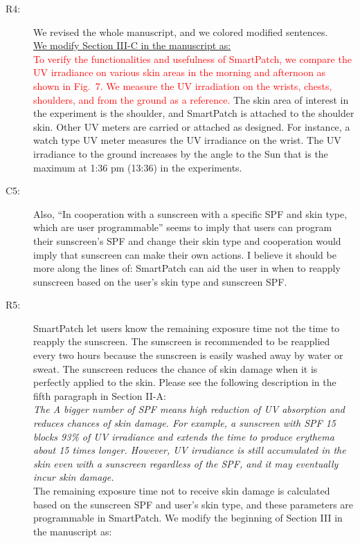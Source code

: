 \documentclass[onecolumn]{IEEEconf}
\begin{document}
\begin{description}
\item [R4: ] We revised the whole manuscript, and we colored modified sentences. \\

\underline{We modify Section III-C in the manuscript as:}\\
\textcolor{red}{To verify the functionalities and usefulness of SmartPatch, we compare the UV irradiance on various skin areas in the morning and afternoon as shown in Fig.~7. We measure the UV irradiation on the wrists, chests, shoulders, and from the ground as a reference.}
The skin area of interest in the experiment is the shoulder, and SmartPatch is attached to the shoulder skin. Other UV meters are carried or attached as designed. For instance, a watch type UV meter measures the UV irradiance on the wrist. The UV irradiance to the ground increases by the angle to the Sun that is the maximum at 1:36 pm (13:36) in the experiments.
~\\

\item [C5:] Also, ``In cooperation with a sunscreen with a specific SPF and skin type, which are user programmable'' seems to imply that users can program their sunscreen's SPF and change their skin type and cooperation would imply that sunscreen can make their own actions. I believe it should be more along the lines of: SmartPatch can aid the user in when to reapply sunscreen based on the user's skin type and sunscreen SPF.

\item [R5: ] 

SmartPatch let users know the remaining exposure time not the time to reapply the sunscreen. The sunscreen is recommended to be reapplied every two hours because the sunscreen is easily washed away by water or sweat. The sunscreen reduces the chance of skin damage when it is perfectly applied to the skin. Please see the following description in the fifth paragraph in Section II-A:\\

\textit{The A bigger number of SPF means high reduction of UV absorption and reduces chances of skin damage. For example, a sunscreen with SPF 15 blocks 93\% of UV irradiance and extends the time to produce erythema about 15 times longer. However, UV irradiance is still accumulated in the skin even with a sunscreen regardless of the SPF, and it may eventually incur skin damage.}\\

The remaining exposure time not to receive skin damage is calculated based on the sunscreen SPF and user's skin type, and these parameters are programmable in SmartPatch. We modify the beginning of Section III in the manuscript as:


\end{description}
\end{document}

